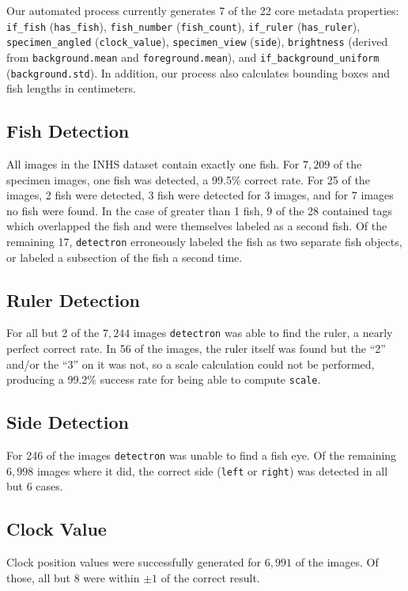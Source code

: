 \documentclass[conference]{IEEEtran}
\begin{document}
Our automated process currently generates 7 of the 22 core metadata properties: \verb|if_fish| (\verb|has_fish|), \verb|fish_number| (\verb|fish_count|), \verb|if_ruler| (\verb|has_ruler|), \verb|specimen_angled| (\verb|clock_value|), \verb|specimen_view| (\verb|side|), \verb|brightness| (derived from \verb|background.mean| and \verb|foreground.mean|), and \verb|if_background_uniform| (\verb|background.std|). In addition, our process also calculates bounding boxes and fish lengths in centimeters.

\subsection{Fish Detection}
All images in the INHS dataset contain exactly one fish. For \(7,209\) of the specimen images, one fish was detected, a 99.5\% correct rate.
For 25 of the images, 2 fish were detected, 3 fish were detected for 3 images, and for 7 images no fish were found. In the case of greater than 1 fish, 9 of the 28 contained tags which overlapped the fish and were themselves labeled as a second fish. Of the remaining 17, \verb|detectron| erroneously labeled the fish as two separate fish objects, or labeled a subsection of the fish a second time.

\subsection{Ruler Detection}
For all but 2 of the \(7,244\) images \verb|detectron| was able to find the ruler, a nearly perfect correct rate.
 In 56 of the images, the ruler itself was found but the ``2'' and/or the ``3'' on it was not, so a scale calculation could not be performed, producing a 99.2\% success rate for being able to compute 
\verb|scale|.

\subsection{Side Detection}
For 246 of the images \verb|detectron| was unable to find a fish eye. Of the remaining \(6,998\) images where it did, the correct side (\verb|left| or \verb|right|) was detected in all but 6 cases.

\subsection{Clock Value}
Clock position values were successfully generated for \(6,991\) of the images. Of those, all but 8 were within \(\pm{}1\) of the correct result.
\end{document}
